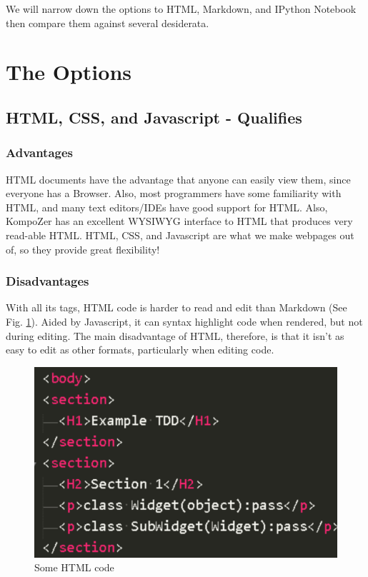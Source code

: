 \documentclass[]{article}
\begin{document}
We will narrow down the options to HTML, Markdown, and IPython Notebook then compare them against several desiderata.


\section{The Options}

\subsection{HTML, CSS, and Javascript - Qualifies}
	\subsubsection{Advantages}
		HTML documents have the advantage that anyone can easily view them, since everyone has a Browser.  
		Also, most programmers have some familiarity with HTML, and many text editors/IDEs have good support for HTML.  
		Also, KompoZer has an excellent WYSIWYG interface to HTML that produces very read-able HTML.  
		HTML, CSS, and Javascript are what we make webpages out of, so they provide great flexibility!
	\subsubsection{Disadvantages}
		With all its tags, HTML code is harder to read and edit than Markdown (See Fig. \ref{HTML code}).  
		Aided by Javascript, it can syntax highlight code when rendered, but not during editing.  
		The main disadvantage of HTML, therefore, is that it isn't as easy to edit as other formats, particularly when editing code.
		\begin{figure}[h]
			\centering
			\includegraphics[scale=.25]{HTML_code.PNG}
			\caption{Some HTML code}
			\label{HTML code}
		\end{figure}
		
\end{document}

